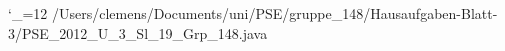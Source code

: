 \begingroup
\catcode`\_=12\relax
/Users/clemens/Documents/uni/PSE/gruppe_148/Hausaufgaben-Blatt-3/PSE_2012_U_3_Sl_19_Grp_148.java
\inputminted{java}{/Users/clemens/Documents/uni/PSE/gruppe_148/Hausaufgaben-Blatt-3/PSE_2012_U_3_Sl_19_Grp_148.java}
\endgroup
